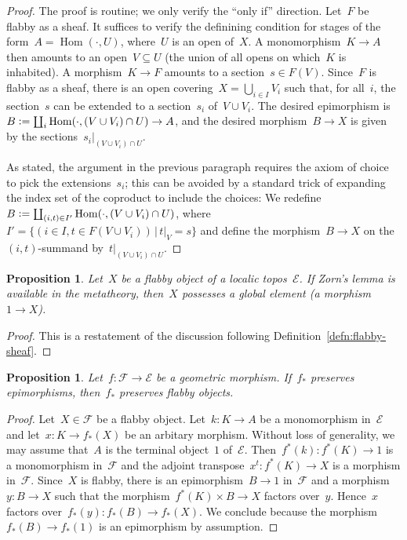 \documentclass[oneside]{amsart}
\theoremstyle{definition}
\theoremstyle{plain}
\newtheorem{prop}[defn]{Proposition}
\theoremstyle{remark}
\newcommand{\E}{\mathcal{E}}
\newcommand{\F}{\mathcal{F}}
\newcommand{\defeq}{\vcentcolon=}
\DeclareMathOperator{\Hom}{Hom}
\renewcommand{\_}{\mathpunct{.}\,}
\begin{document}
\begin{proof}The proof is routine; we only verify the ``only if'' direction.
Let~$F$ be flabby as a sheaf. It suffices to verify the definining condition for stages
of the form~$A = \Hom(\cdot,U)$, where~$U$ is an open of~$X$. A monomorphism~$K
\to A$ then amounts to an open~$V \subseteq U$ (the union of all opens on
which~$K$ is inhabited). A morphism~$K \to F$ amounts to a section~$s \in
F(V)$. Since~$F$ is flabby as a sheaf, there is an open covering~$X =
\bigcup_{i \in I} V_i$ such that, for all~$i$, the section~$s$ can be extended
to a section~$s_i$ of~$V \cup V_i$. The desired epimorphism is~$B \defeq
\coprod_i \Hom(\cdot,(V \cup V_i) \cap U) \to A$, and the desired morphism~$B
\to X$ is given by the sections~$s_i|_{(V \cup V_i) \cap U}$.

As stated, the argument in the previous paragraph requires the axiom of choice
to pick the extensions~$s_i$; this can be avoided by a standard trick of
expanding the index set of the coproduct to include the choices: We redefine $B \defeq
\coprod_{(i,t) \in I'} \Hom(\cdot, (V \cup V_i) \cap U)$, where~$I' = \{ (i \in
I, t \in F(V \cup V_i)) \,|\, t|_V = s \}$ and define the morphism~$B \to X$ on
the~$(i,t)$-summand by~$t|_{(V \cup V_i) \cap U}$.
\end{proof}

\begin{prop}\label{prop:global-elements}
Let~$X$ be a flabby object of a localic topos~$\E$. If
Zorn's lemma is available in the metatheory, then~$X$ possesses a global element (a morphism~$1 \to X$).
\end{prop}

\begin{proof}This is a restatement of the discussion following
Definition~\ref{defn:flabby-sheaf}.
\end{proof}

\begin{prop}\label{prop:pushforward-of-flabby-objects}
Let~$f : \F \to \E$ be a geometric morphism. If~$f_*$ preserves epimorphisms,
then~$f_*$ preserves flabby objects.\end{prop}

\begin{proof}Let~$X \in \F$ be a flabby object.
Let~$k : K \to A$ be a monomorphism in~$\E$ and let~$x : K \to f_*(X)$ be an
arbitary morphism. Without loss of generality, we may assume that~$A$ is the
terminal object~$1$ of~$\E$. Then~$f^*(k) : f^*(K) \to 1$ is a monomorphism
in~$\F$ and the adjoint transpose~$x^t : f^*(K) \to X$
is a morphism in~$\F$. Since~$X$ is flabby, there is an epimorphism~$B \to 1$
in~$\F$ and a morphism~$y : B \to X$ such that the morphism~$f^*(K) \times B
\to X$ factors over~$y$. Hence~$x$ factors over~$f_*(y) : f_*(B) \to f_*(X)$.
We conclude because the morphism~$f_*(B) \to f_*(1)$ is an epimorphism by
assumption.
\end{proof}
\end{document}
